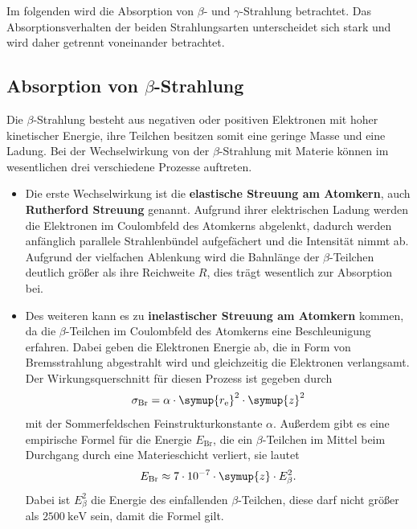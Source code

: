 Im folgenden wird die Absorption von $\beta$- und $\gamma$-Strahlung betrachtet.
Das Absorptionsverhalten der beiden Strahlungsarten unterscheidet sich stark und wird daher getrennt voneinander betrachtet.

\subsection{\texorpdfstring{Absorption von $\beta$-Strahlung}{Absorption von Beta-Strahlung}}

Die $\beta$-Strahlung besteht aus negativen oder positiven Elektronen mit hoher kinetischer Energie, ihre Teilchen
besitzen somit eine geringe Masse und eine Ladung.
Bei der Wechselwirkung von der $\beta$-Strahlung mit Materie können im wesentlichen drei verschiedene Prozesse auftreten.
\begin{itemize}
    \item Die erste Wechselwirkung ist die \textbf{elastische Streuung am Atomkern}, auch \textbf{Rutherford Streuung} genannt.
    Aufgrund ihrer elektrischen Ladung werden die Elektronen im Coulombfeld des Atomkerns abgelenkt, dadurch werden anfänglich
    parallele Strahlenbündel aufgefächert und die Intensität nimmt ab. Aufgrund der vielfachen Ablenkung wird die Bahnlänge der
    $\beta$-Teilchen deutlich größer als ihre Reichweite $R$, dies trägt wesentlich zur Absorption bei.

    \item Des weiteren kann es zu \textbf{inelastischer Streuung am Atomkern} kommen, da die $\beta$-Teilchen im Coulombfeld des
    Atomkerns eine Beschleunigung erfahren. Dabei geben die Elektronen Energie ab, die in Form von Bremsstrahlung
    abgestrahlt wird und gleichzeitig die Elektronen verlangsamt. Der Wirkungsquerschnitt für diesen Prozess ist gegeben durch
    \begin{equation}
        \label{sigma_br}
        \sigma_{\text{Br}}=\alpha \cdot \symup{r_{\text{e}}}^2 \cdot \symup{z}^2
    \end{equation}
    mit der Sommerfeldschen Feinstrukturkonstante $\alpha$.
    Außerdem gibt es eine empirische Formel für die Energie $E_{\text{Br}}$, die ein $\beta$-Teilchen im Mittel beim
    Durchgang durch eine Materieschicht verliert, sie lautet
    \begin{equation}
        \label{E_br}
        E_{\text{Br}} \approx 7\cdot 10^{-7} \cdot \symup{z} \cdot E_{\beta}^2.
    \end{equation}
    Dabei ist $E_{\beta}^2$ die Energie des einfallenden $\beta$-Teilchen, diese darf nicht größer
    als $\qty{2500}{\kilo\electronvolt}$  sein, damit die Formel gilt.


\end{itemize}
